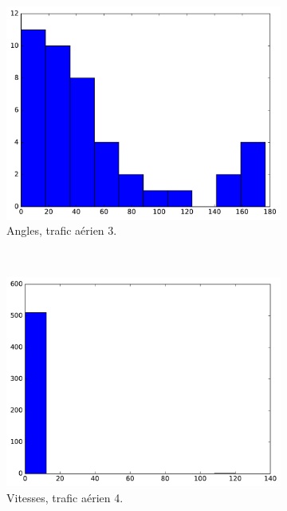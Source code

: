\begin{figure}[!htbp]
\begin{subfigure}[t]{\subImgWclicks}
			\centering
			\includegraphics[width=\textwidth]{figures/ch3/hkg_angle}
			\caption{Angles, trafic aérien 3.}
			\label{fig:hkg_angle}
		\end{subfigure}
		~
		\begin{subfigure}[t]{\subImgWclicks}
			\centering
			\includegraphics[width=\textwidth]{figures/ch3/flightradar2a_filteredSpeed}
			\caption{Vitesses, trafic aérien 4.}
			\label{fig:flightradar2a_filteredSpeed}
		\end{subfigure}
		~
		\begin{subfigure}[t]{\subImgWclicks}
			\centering

\end{subfigure}
\end{figure}
